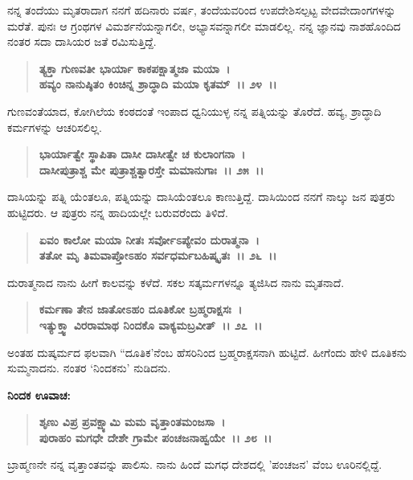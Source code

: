 ನನ್ನ ತಂದೆಯು ಮೃತರಾದಾಗ ನನಗೆ ಹದಿನಾರು ವರ್ಷ, ತಂದೆಯವರಿಂದ ಉಪದೇಶಿಸಲ್ಪಟ್ಟ ವೇದವೇದಾಂಗಗಳನ್ನು ಮರೆತೆ. ಪುನಃ ಆ ಗ್ರಂಥಗಳ ವಿಮರ್ಶನೆಯನ್ನಾಗಲೀ, ಅಭ್ಯಾಸವನ್ನಾಗಲೀ ಮಾಡಲಿಲ್ಲ. ನನ್ನ ಜ್ಞಾನವು ನಾಶಹೊಂದಿದ ನಂತರ ಸದಾ ದಾಸಿಯರ ಜತೆ ರಮಿಸುತ್ತಿದ್ದೆ.

\begin{verse}
\textbf{ತ್ಯಕ್ತಾ ಗುಣವತೀ ಭಾರ್ಯಾ ಕಾಕಪಕ್ಷಾತ್ಮಜಾ ಮಯಾ~।}\\\textbf{ಹವ್ಯಂ ನಾನುಷ್ಠಿತಂ ಕಿಂಚಿನ್ನ ಶ್ರಾದ್ಧಾದಿ ಮಯಾ ಕೃತಮ್~।। ೨೪~।।}
\end{verse}

ಗುಣವಂತೆಯಾದ, ಕೋಗಿಲೆಯ ಕಂಠದಂತೆ ಇಂಪಾದ ಧ್ವನಿಯುಳ್ಳ ನನ್ನ ಪತ್ನಿಯನ್ನು ತೊರೆದೆ. ಹವ್ಯ, ಶ್ರಾದ್ಧಾದಿ ಕರ್ಮಗಳನ್ನು ಆಚರಿಸಲಿಲ್ಲ.

\begin{verse}
\textbf{ಭಾರ್ಯಾತ್ವೇ ಸ್ಥಾಪಿತಾ ದಾಸೀ ದಾಸೀತ್ವೇ ಚ ಕುಲಾಂಗನಾ~।}\\\textbf{ದಾಸೀಪುತ್ರಾಶ್ಚ ಮೇ ಪುತ್ರಾಶ್ಚತ್ವಾರಸ್ತೇ ಮಮಾನುಗಾಃ~।। ೨೫~।।}
\end{verse}

ದಾಸಿಯನ್ನು ಪತ್ನಿ ಯೆಂತಲೂ, ಪತ್ನಿಯನ್ನು ದಾಸಿಯೆಂತಲೂ ಕಾಣುತ್ತಿದ್ದೆ. ದಾಸಿಯಿಂದ ನನಗೆ ನಾಲ್ಕು ಜನ ಪುತ್ರರು ಹುಟ್ಟಿದರು. ಆ ಪುತ್ರರು ನನ್ನ ಹಾದಿಯಲ್ಲೇ ಬರುವರೆಂದು ತಿಳಿದೆ.

\begin{verse}
\textbf{ಏವಂ ಕಾಲೋ ಮಯಾ ನೀತಃ ಸರ್ವೋಽಪ್ಯೇವಂ ದುರಾತ್ಮನಾ~।}\\\textbf{ತತೋ ಮೃ ತಿಮವಾಪ್ತೋಽಹಂ ಸರ್ವಧರ್ಮಬಹಿಷ್ಕೃತಃ~।। ೨೬~।।}
\end{verse}

ದುರಾತ್ಮನಾದ ನಾನು ಹೀಗೆ ಕಾಲವನ್ನು ಕಳೆದೆ. ಸಕಲ ಸತ್ಕರ್ಮಗಳನ್ನೂ ತ್ಯಜಿಸಿದ ನಾನು ಮೃತನಾದೆ.

\begin{verse}
\textbf{ಕರ್ಮಣಾ ತೇನ ಜಾತೋಽಹಂ ದೂತಿಕೋ ಬ್ರಹ್ಮರಾಕ್ಷಸಃ~।}\\\textbf{ಇತ್ಯುಕ್ತ್ವಾ ವಿರರಾಮಾಥ ನಿಂದಕೊ ವಾಕ್ಯಮಬ್ರವೀತ್~।। ೨೭~।।}
\end{verse}

ಅಂತಹ ದುಷ್ಕರ್ಮದ ಫಲವಾಗಿ “ದೂತಿಕ'ನೆಂಬ ಹೆಸರಿನಿಂದ ಬ್ರಹ್ಮರಾಕ್ಷಸನಾಗಿ ಹುಟ್ಟಿದೆ. ಹೀಗೆಂದು ಹೇಳಿ ದೂತಿಕನು ಸುಮ್ಮನಾದನು. ನಂತರ `ನಿಂದಕನು' ನುಡಿದನು.

\begin{flushleft}
\textbf{ನಿಂದಕ ಊವಾಚ:\enginline{-}}
\end{flushleft}

\begin{verse}
\textbf{ಶೃಣು ವಿಪ್ರ ಪ್ರವಕ್ಷ್ಯಾಮಿ ಮಮ ವೃತ್ತಾಂತಮಂಜಸಾ~।}\\\textbf{ಪುರಾಹಂ ಮಗಧೇ ದೇಶೇ ಗ್ರಾಮೇ ಪಂಚಜನಾಹ್ವಯೇ~।। ೨೮~।।}
\end{verse}

ಬ್ರಾಹ್ಮಣನೇ ನನ್ನ ವೃತ್ತಾಂತವನ್ನು ಪಾಲಿಸು. ನಾನು ಹಿಂದೆ ಮಗಧ ದೇಶದಲ್ಲಿ 'ಪಂಚಜನ' ವೆಂಬ ಊರಿನಲ್ಲಿದ್ದೆ.

